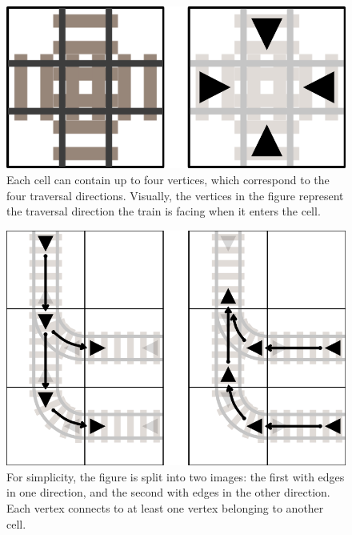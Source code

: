 \begin{figure}[h!]
        \includegraphics[width=.35\linewidth]{img/cross_both.png}
    \caption{ Each cell can contain up to four vertices, which correspond to the four traversal directions. Visually, the vertices in the figure represent the traversal direction the train is facing when it enters the cell. }
    \label{fig:verticalcell}
\end{figure}

\begin{figure}[h!]
        \includegraphics[width=.5\linewidth]{img/env_both.png}
    \caption{ For simplicity, the figure is split into two images: the first with edges in one direction, and the second with edges in the other direction.  Each vertex connects to at least one vertex belonging to another cell. } %
    \label{fig:verticalcell}
\end{figure}
